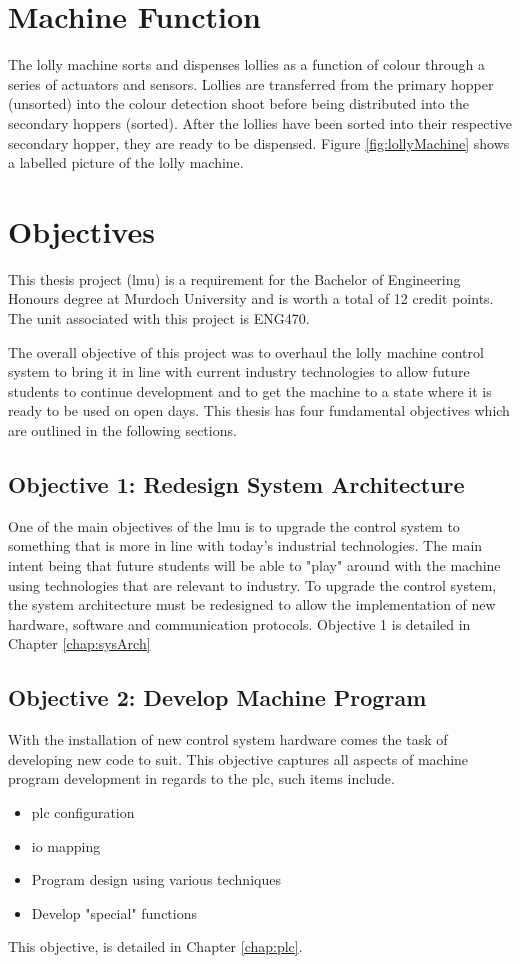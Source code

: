 \section{Machine Function}
    The lolly machine sorts and dispenses lollies as a function of colour through a series of actuators and sensors. Lollies are transferred from the primary hopper (unsorted) into the colour detection shoot before being distributed into the secondary hoppers (sorted). After the lollies have been sorted into their respective secondary hopper, they are ready to be dispensed. Figure \ref{fig:lollyMachine} shows a labelled picture of the lolly machine. 

\section{Objectives}
   This thesis project (\acrlong{lmu}) is a requirement for the Bachelor of Engineering Honours degree at Murdoch University and is worth a total of 12 credit points. The unit associated with this project is ENG470. 
   
   The overall objective of this project was to overhaul the lolly machine control system to bring it in line with current industry technologies to allow future students to continue development and to get the machine to a state where it is ready to be used on open days. This thesis has four fundamental objectives which are outlined in the following sections.
   
    
    \subsection{Objective 1: Redesign System Architecture}
        One of the main objectives of the \acrshort{lmu} is to upgrade the control system to something that is more in line with today's industrial technologies. The main intent being that future students will be able to  "play" around with the machine using technologies that are relevant to industry. To upgrade the control system, the system architecture must be redesigned to allow the implementation of new hardware, software and communication protocols. Objective 1 is detailed in Chapter \ref{chap:sysArch}
        
    \subsection{Objective 2: Develop Machine Program}
        With the installation of new control system hardware comes the task of developing new code to suit.
        This objective captures all aspects of machine program development in regards to the \acrshort{plc}, such items include.
        \begin{itemize}
            \item \acrshort{plc} configuration
            \item \acrshort{io} mapping
            \item Program design using various techniques
            \item Develop "special" functions
        \end{itemize}
        This objective, is detailed in Chapter \ref{chap:plc}.
        
